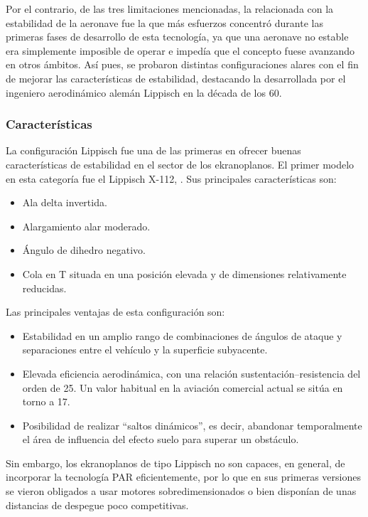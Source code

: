 Por el contrario, de las tres limitaciones mencionadas, la relacionada con la estabilidad de la aeronave fue la que más esfuerzos concentró durante las primeras fases de desarrollo de esta tecnología, ya que una aeronave no estable era simplemente imposible de operar e impedía que el concepto fuese avanzando en otros ámbitos. Así pues, se probaron distintas configuraciones alares con el fin de mejorar las características de estabilidad, destacando la desarrollada por el ingeniero aerodinámico alemán Lippisch en la década de los 60.


\subsubsection{Características}
\label{sec:wig:lippisch:characteristics}

La configuración Lippisch fue una de las primeras en ofrecer buenas características de estabilidad en el sector de los ekranoplanos. El primer modelo en esta categoría fue el Lippisch X-112,
 . Sus principales características son:
\begin{itemize}
\item Ala delta invertida.
\item Alargamiento alar moderado.
\item Ángulo de dihedro negativo.
\item Cola en T situada en una posición elevada y de dimensiones relativamente reducidas.
\end{itemize}


Las principales ventajas de esta configuración son:
\begin{itemize}
\item Estabilidad en un amplio rango de combinaciones de ángulos de ataque y separaciones entre el vehículo y la superficie subyacente.
\item Elevada eficiencia aerodinámica, con una relación sustentación–resistencia del orden de 25. Un valor habitual en la aviación comercial actual se sitúa en torno a 17.
\item Posibilidad de realizar “saltos dinámicos”, es decir, abandonar temporalmente el área de influencia del efecto suelo para superar un obstáculo.
\end{itemize}

Sin embargo, los ekranoplanos de tipo Lippisch no son capaces, en general, de incorporar la tecnología PAR eficientemente, por lo que en sus primeras versiones se vieron obligados a usar motores sobredimensionados o bien disponían de unas distancias de despegue poco competitivas.



